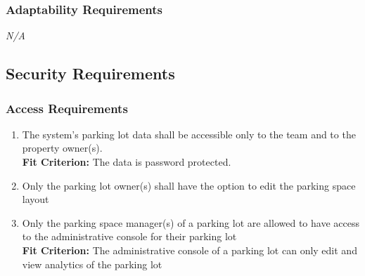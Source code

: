 \documentclass[12pt,letterpaper]{article}
\begin{document}
\subsubsection{Adaptability Requirements}
\noindent \emph{N/A}

\subsection{Security Requirements}
\subsubsection{Access Requirements}
\begin{enumerate}[{SR}1.] 
    \item The system's parking lot data shall be accessible only to the team and
    to the property owner(s).\label{pocnf5} \\
    \textbf{Fit Criterion:} The data is password protected.
    \item Only the parking lot owner(s) shall have the option to edit the
    parking space layout \label{asr2} \\
    \color{black}
    \item Only the parking space manager(s) of a parking lot are allowed to have
    access to the administrative console for their parking lot \label{asr3}\\
    \textbf{Fit Criterion:} The administrative console of a parking lot can only
    edit and view analytics of the parking lot
\end{enumerate}
\end{document}
